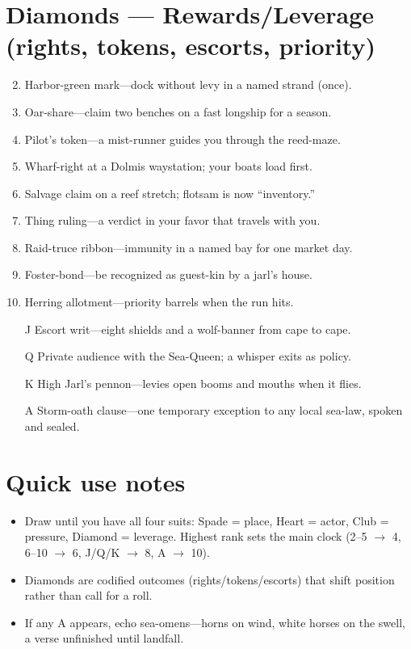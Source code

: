 \section*{Diamonds --- Rewards/Leverage (rights, tokens, escorts, priority)}
\label{sec:linn-rewards}
\begin{enumerate}
\setcounter{enumi}{1}
\item Harbor-green mark---dock without levy in a named strand (once).
\item Oar-share---claim two benches on a fast longship for a season.
\item Pilot's token---a mist-runner guides you through the reed-maze.
\item Wharf-right at a Dolmis waystation; your boats load first.
\item Salvage claim on a reef stretch; flotsam is now ``inventory.''
\item Thing ruling---a verdict in your favor that travels with you.
\item Raid-truce ribbon---immunity in a named bay for one market day.
\item Foster-bond---be recognized as guest-kin by a jarl's house.
\item Herring allotment---priority barrels when the run hits.
\item[J] Escort writ---eight shields and a wolf-banner from cape to cape.
\item[Q] Private audience with the Sea-Queen; a whisper exits as policy.
\item[K] High Jarl's pennon---levies open booms and mouths when it flies.
\item[A] Storm-oath clause---one temporary exception to any local sea-law, spoken and sealed.
\end{enumerate}

\section*{Quick use notes}
\label{sec:linn-quick-use}
\begin{itemize}
\item Draw until you have all four suits: Spade = place, Heart = actor, Club = pressure, Diamond = leverage. Highest rank sets the main clock (2--5 $\rightarrow$ 4, 6--10 $\rightarrow$ 6, J/Q/K $\rightarrow$ 8, A $\rightarrow$ 10).
\item Diamonds are codified outcomes (rights/tokens/escorts) that shift position rather than call for a roll.
\item If any A appears, echo sea-omens---horns on wind, white horses on the swell, a verse unfinished until landfall.
\end{itemize}

